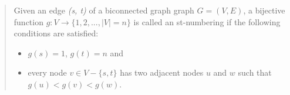 \begin{quote}
  Given an edge \textit{(s, t)} of a biconnected graph graph $ G = (V, E) $, a bijective function $ g: V \rightarrow \{ 1, 2, ..., |V|=n \} $ is called an st-numbering if the following conditions are satisfied:

  \begin{itemize}
  \item $ g(s) = 1 $, $ g(t) = n $ and
    \item every node $ v \in V - \{ s, t \} $ has two adjacent nodes $ u $ and $ w $ such that $ g(u) < g(v) < g(w) $.
  \end{itemize}
\end{quote}




\sloppy
\printbibliography


